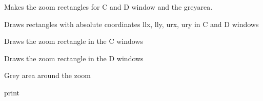 \documentclass[letterpaper,10pt,openany,oneside]{sphinxmanual}
\begin{document}
\begin{fulllineitems}
\label{rst/visu2d:Visu.zoom_plot.ZOOM_PLOT}
Makes the zoom rectangles for C and D window and the greyarea.

\begin{fulllineitems}
\label{rst/visu2d:Visu.zoom_plot.ZOOM_PLOT.drawrect}
Draws rectangles with absolute coordinates llx, lly, urx, ury in C and D windows

\end{fulllineitems}


\begin{fulllineitems}
\label{rst/visu2d:Visu.zoom_plot.ZOOM_PLOT.drawrectC}
Draws the zoom rectangle in the C windows

\end{fulllineitems}


\begin{fulllineitems}
\label{rst/visu2d:Visu.zoom_plot.ZOOM_PLOT.drawrectD}
Draws the zoom rectangle in the D windows

\end{fulllineitems}


\begin{fulllineitems}
\label{rst/visu2d:Visu.zoom_plot.ZOOM_PLOT.greyzoom}
Grey area around the zoom

\end{fulllineitems}


\begin{fulllineitems}
\label{rst/visu2d:Visu.zoom_plot.ZOOM_PLOT.pr}
print

\end{fulllineitems}


\end{fulllineitems}
\end{document}
